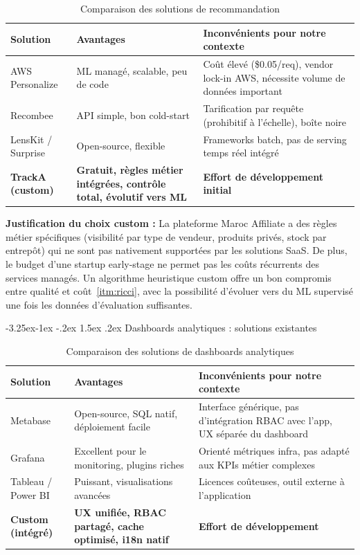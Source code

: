 \documentclass[12pt,a4paper,openany]{report}
\makeatletter
\renewcommand\subsection{\@startsection{subsection}{2}{\z@}%
  {-3.25ex\@plus -1ex \@minus -.2ex}%
  {1.5ex \@plus .2ex}%
  {\needspace{8\baselineskip}\normalfont\large\bfseries\color{primary!80!black}}}
\makeatother
\begin{document}
\begin{table}[H]
\centering
{}
\begin{tabularx}{\textwidth}{lXX}
\toprule
\rowcolor{headerblue!20}
\textbf{Solution} & \textbf{Avantages} & \textbf{Inconvénients pour notre contexte} \\
\midrule
AWS Personalize & ML managé, scalable, peu de code & Coût élevé (\$0.05/req), vendor lock-in AWS, nécessite volume de données important \\
Recombee & API simple, bon cold-start & Tarification par requête (prohibitif à l'échelle), boîte noire \\
LensKit / Surprise & Open-source, flexible & Frameworks batch, pas de serving temps réel intégré \\
\textbf{TrackA (custom)} & \textbf{Gratuit, règles métier intégrées, contrôle total, évolutif vers ML} & \textbf{Effort de développement initial} \\
\bottomrule
\end{tabularx}
\caption{Comparaison des solutions de recommandation}
\end{table}

\textbf{Justification du choix custom :} La plateforme Maroc Affiliate a des règles métier spécifiques (visibilité par type de vendeur, produits privés, stock par entrepôt) qui ne sont pas nativement supportées par les solutions SaaS. De plus, le budget d'une startup early-stage ne permet pas les coûts récurrents des services managés. Un algorithme heuristique custom offre un bon compromis entre qualité et coût~\ref{itm:ricci}, avec la possibilité d'évoluer vers du ML supervisé une fois les données d'évaluation suffisantes.

\subsection{Dashboards analytiques : solutions existantes}

\begin{table}[H]
\centering
{}
\begin{tabularx}{\textwidth}{lXX}
\toprule
\rowcolor{headerblue!20}
\textbf{Solution} & \textbf{Avantages} & \textbf{Inconvénients pour notre contexte} \\
\midrule
Metabase & Open-source, SQL natif, déploiement facile & Interface générique, pas d'intégration RBAC avec l'app, UX séparée du dashboard \\
Grafana & Excellent pour le monitoring, plugins riches & Orienté métriques infra, pas adapté aux KPIs métier complexes \\
Tableau / Power BI & Puissant, visualisations avancées & Licences coûteuses, outil externe à l'application \\
\textbf{Custom (intégré)} & \textbf{UX unifiée, RBAC partagé, cache optimisé, i18n natif} & \textbf{Effort de développement} \\
\bottomrule
\end{tabularx}
\caption{Comparaison des solutions de dashboards analytiques}
\end{table}
\end{document}
